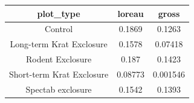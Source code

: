 \documentclass[]{article}
\begin{document}
\begin{longtable}[c]{@{}ccc@{}}
\toprule
\begin{minipage}[b]{0.33\columnwidth}\centering\strut
plot\_type
\strut\end{minipage} &
\begin{minipage}[b]{0.11\columnwidth}\centering\strut
loreau
\strut\end{minipage} &
\begin{minipage}[b]{0.11\columnwidth}\centering\strut
gross
\strut\end{minipage}\tabularnewline
\midrule
\endhead
\begin{minipage}[t]{0.33\columnwidth}\centering\strut
Control
\strut\end{minipage} &
\begin{minipage}[t]{0.11\columnwidth}\centering\strut
0.1869
\strut\end{minipage} &
\begin{minipage}[t]{0.11\columnwidth}\centering\strut
0.1263
\strut\end{minipage}\tabularnewline
\begin{minipage}[t]{0.33\columnwidth}\centering\strut
Long-term Krat Exclosure
\strut\end{minipage} &
\begin{minipage}[t]{0.11\columnwidth}\centering\strut
0.1578
\strut\end{minipage} &
\begin{minipage}[t]{0.11\columnwidth}\centering\strut
0.07418
\strut\end{minipage}\tabularnewline
\begin{minipage}[t]{0.33\columnwidth}\centering\strut
Rodent Exclosure
\strut\end{minipage} &
\begin{minipage}[t]{0.11\columnwidth}\centering\strut
0.187
\strut\end{minipage} &
\begin{minipage}[t]{0.11\columnwidth}\centering\strut
0.1423
\strut\end{minipage}\tabularnewline
\begin{minipage}[t]{0.33\columnwidth}\centering\strut
Short-term Krat Exclosure
\strut\end{minipage} &
\begin{minipage}[t]{0.11\columnwidth}\centering\strut
0.08773
\strut\end{minipage} &
\begin{minipage}[t]{0.11\columnwidth}\centering\strut
0.001546
\strut\end{minipage}\tabularnewline
\begin{minipage}[t]{0.33\columnwidth}\centering\strut
Spectab exclosure
\strut\end{minipage} &
\begin{minipage}[t]{0.11\columnwidth}\centering\strut
0.1542
\strut\end{minipage} &
\begin{minipage}[t]{0.11\columnwidth}\centering\strut
0.1393
\strut\end{minipage}\tabularnewline
\bottomrule
\end{longtable}
\end{document}
